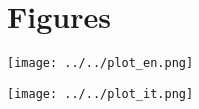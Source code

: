 \documentclass[12pt]{article}
\begin{document}


\fontsize{11}{15}\selectfont{
    
}

\newpage
\section{Figures}
\begin{center}
    \texttt{[image: ../../plot\_en.png]}
    \label{fig 1: english poem}
\end{center}

\begin{center}
    \texttt{[image: ../../plot\_it.png]}
    \label{fig 2: italian poem}
\end{center}

\end{document}

